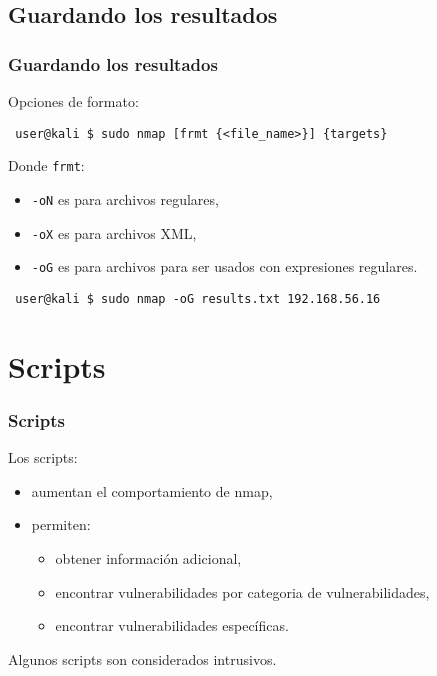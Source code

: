 \documentclass[aspectratio=169]{beamer}
\begin{document}
\subsection{Guardando los resultados}
\begin{frame}[fragile]
    \frametitle{Guardando los resultados}

    Opciones de formato:

    \begin{lstlisting}
 user@kali $ sudo nmap [frmt {<file_name>}] {targets}
    \end{lstlisting}

    \pause

    Donde \texttt{frmt}:

    \begin{itemize}
        \item \texttt{-oN} es para archivos regulares,
        \item \texttt{-oX} es para archivos XML,
        \item \texttt{-oG} es para archivos para ser usados con expresiones regulares.
    \end{itemize}

    \pause

    \begin{lstlisting}
 user@kali $ sudo nmap -oG results.txt 192.168.56.16
    \end{lstlisting}
    
\end{frame}

\section{Scripts}

\begin{frame}[fragile]
    \frametitle{Scripts}

    Los scripts:

    \begin{itemize}
        \item aumentan el comportamiento de nmap,
        \item permiten:
        \begin{itemize}
            \item obtener informaci\'on adicional,
            \item encontrar vulnerabilidades por categoria de vulnerabilidades,
            \item encontrar vulnerabilidades espec\'ificas.
        \end{itemize}
    \end{itemize}

    \pause

    \begin{block}{}
        \begin{center}
            Algunos scripts son considerados intrusivos.
        \end{center}
    \end{block}

\end{frame}
\end{document}
